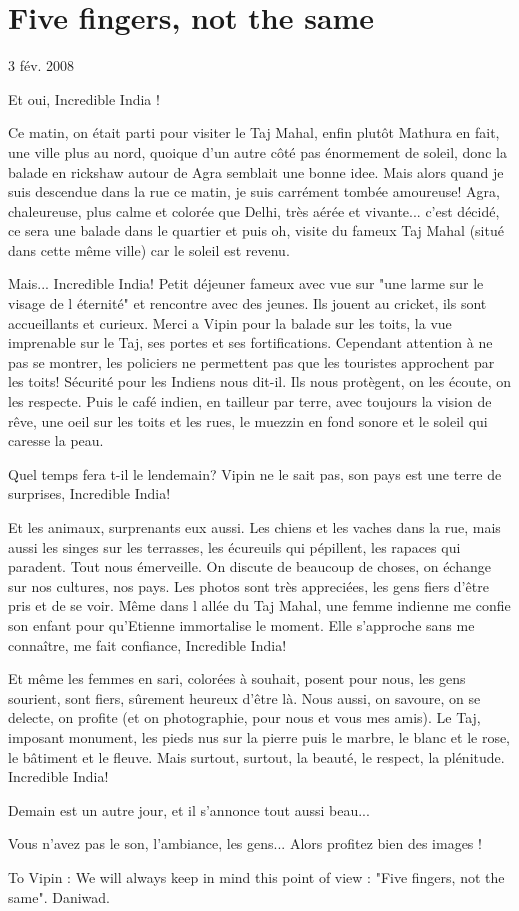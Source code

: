 \section{Five fingers, not the same}

3 fév. 2008

\begin{multicols}{2}

Et oui, Incredible India !

Ce matin, on était parti pour visiter le Taj Mahal, enfin plutôt Mathura en fait, une ville plus au nord, quoique d'un autre côté pas énormement de soleil, donc la balade en rickshaw autour de Agra semblait une bonne idee. Mais alors quand je suis descendue dans la rue ce matin, je suis carrément tombée amoureuse! Agra, chaleureuse, plus calme et colorée que Delhi, très aérée et vivante... c'est décidé, ce sera une balade dans le quartier et puis oh, visite du fameux Taj Mahal (situé dans cette même ville) car le soleil est revenu.

Mais... Incredible India! Petit déjeuner fameux avec vue sur "une larme sur le visage de l éternité" et rencontre avec des jeunes. Ils jouent au cricket, ils sont accueillants et curieux. Merci a Vipin pour la balade sur les toits, la vue imprenable sur le Taj, ses portes et ses fortifications. Cependant attention à ne pas se montrer, les policiers ne permettent pas que les touristes approchent par les toits! Sécurité pour les Indiens nous dit-il. Ils nous protègent, on les écoute, on les respecte. Puis le café indien, en tailleur par terre, avec toujours la vision de rêve, une oeil sur les toits et les rues, le muezzin en fond sonore et le soleil qui caresse la peau.

Quel temps fera t-il le lendemain? Vipin ne le sait pas, son pays est une terre de surprises, Incredible India!

Et les animaux, surprenants eux aussi. Les chiens et les vaches dans la rue, mais aussi les singes sur les terrasses, les écureuils qui pépillent, les rapaces qui paradent. Tout nous émerveille. On discute de beaucoup de choses, on échange sur nos cultures, nos pays. Les photos sont très appreciées, les gens fiers d'être pris et de se voir. Même dans l allée du Taj Mahal, une femme indienne me confie son enfant pour qu'Etienne immortalise le moment. Elle s'approche sans me connaître, me fait confiance, Incredible India!

Et même les femmes en sari, colorées à souhait, posent pour nous, les gens sourient, sont fiers, sûrement heureux d'être là. Nous aussi, on savoure, on se delecte, on profite (et on photographie, pour nous et vous mes amis). Le Taj, imposant monument, les pieds nus sur la pierre puis le marbre, le blanc et le rose, le bâtiment et le fleuve. Mais surtout, surtout, la beauté, le respect, la plénitude. Incredible India!

Demain est un autre jour, et il s'annonce tout aussi beau...

Vous n'avez pas le son, l'ambiance, les gens... Alors profitez bien des images !

To Vipin : We will always keep in mind this point of view : "Five fingers, not the same". Daniwad.

\end{multicols}


